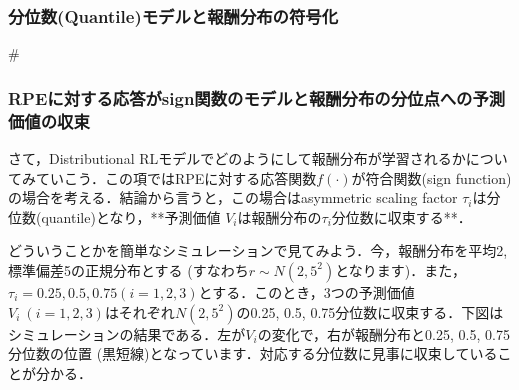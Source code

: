 \subsubsection{分位数(Quantile)モデルと報酬分布の符号化}#\subsubsection{RPEに対する応答がsign関数のモデルと報酬分布の分位点への予測価値の収束}さて，Distributional RLモデルでどのようにして報酬分布が学習されるかについてみていこう．この項ではRPEに対する応答関数$f(\cdot)$が符合関数(sign function)の場合を考える．結論から言うと，この場合はasymmetric scaling factor $\tau_i$は分位数(quantile)となり，**予測価値
$V_i$は報酬分布の$\tau_i$分位数に収束する**．
    
どういうことかを簡単なシミュレーションで見てみよう．今，報酬分布を平均2, 標準偏差5の正規分布とする (すなわち$r \sim N(2, 5^2)$となります)．また，$\tau_i = 0.25, 0.5, 0.75 (i=1,2,3)$とする．このとき，3つの予測価値 $V_i \ (i=1,2,3)$はそれぞれ$N(2, 5^2)$の0.25, 0.5,
0.75分位数に収束する．下図はシミュレーションの結果である．左が$V_i$の変化で，右が報酬分布と0.25, 0.5, 0.75分位数の位置 (黒短線)となっています．対応する分位数に見事に収束していることが分かる．
